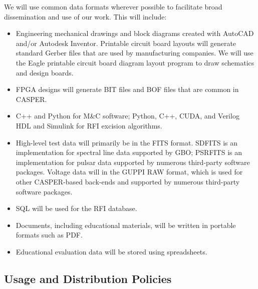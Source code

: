 \documentclass[10pt]{NSF}
\begin{document}
We will use common data formats wherever possible to facilitate broad
dissemination and use of our work.  This will include:
\begin{itemize}
\item{Engineering mechanical drawings and block diagrams created with
  AutoCAD and/or Autodesk Inventor.  Printable circuit board layouts
  will generate standard Gerber files that are used by manufacturing
  companies.  We will use the Eagle printable circuit board diagram
  layout program to draw schematics and design boards.}
\item{FPGA designs will generate BIT files and BOF files that are
  common in CASPER.}
\item{C++ and Python for M\&C software; Python, C++, CUDA, and Verilog
  HDL and Simulink for RFI excision algorithms.}
\item{High-level test data will primarily be in the FITS format.
  SDFITS is an implementation for spectral line data supported by GBO;
  PSRFITS is an implementation for pulsar data supported by numerous
  third-party software packages.  Voltage data will in the GUPPI RAW
  format, which is used for other CASPER-based back-ends and supported
  by numerous third-party software packages.}
\item{SQL will be used for the RFI database.}
\item{Documents, including educational materials, will be written in
  portable formats such as PDF.}
\item{Educational evaluation data will be stored using spreadsheets.}
\end{itemize}

\subsection{Usage and Distribution Policies}
\end{document}
